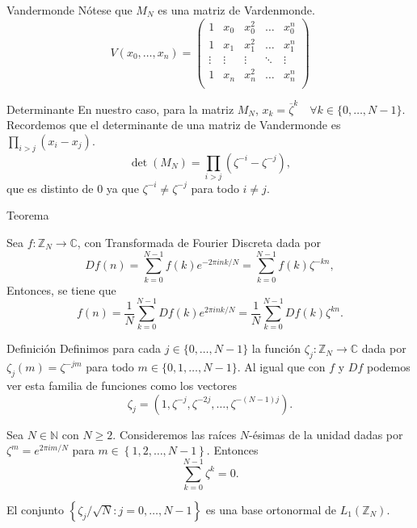 \documentclass[11pt,compress]{beamer}
\newcommand\C{\mathbb{C}}
\newcommand\Z{\mathbb{Z}}
\newcommand\N{\mathbb{N}}
\begin{document}
\begin{frame}
\begin{block}{Vandermonde}
Nótese que $M_N$ es una matriz de Vardenmonde.
\[
V(x_{0},\dots,x_{n})=\begin{pmatrix}
1&x_{0}&x_{0}^{2}&\dots&x_{0}^{n} \\
1&x_{1}&x_{1}^{2}&\dots&x_{1}^{n} \\
\vdots&\vdots&\vdots&\ddots&\vdots\\
1&x_{n}&x_{n}^{2}&\dots&x_{n}^{n} \\
\end{pmatrix}
\]
\end{block}
\begin{block}{Determinante}
En nuestro caso, para la matriz $M_N$, $x_k=\overline{\zeta}^k \quad \forall k \in \{0, \dots, N-1\}$. 
Recordemos que el determinante de una matriz de Vandermonde es $\prod_{i>j}(x_i-x_j)$.
\[
\det(M_N)=\prod_{i>j}(\zeta^{-i}-\zeta^{-j}),
\]
que es distinto de $0$ ya que $\zeta^{-i} \ne \zeta^{-j}$ para todo $i \ne j$.
\end{block}
\end{frame}

\begin{frame}{Teorema}
    \begin{theorem}
    Sea $f:\Z_N \rightarrow \C$, con Transformada de Fourier Discreta dada por
    \[
        Df(n) = \sum_{k=0}^{N-1}f(k)e^{-2\pi ink /N} = \sum_{k=0}^{N-1} f(k)  \zeta ^{-kn},
    \]
    Entonces, se tiene que
    \[
        f(n) = \frac{1}{N} \sum_{k=0}^{N-1} Df(k)e^{2\pi ink / N} = \frac{1}{N} \sum_{k=0}^{N-1} Df(k) \zeta ^{kn}.
    \]
\end{theorem}
\end{frame}

\begin{frame}
\begin{block}{Definición}
Definimos para cada $j \in \{0,\dots,N-1\}$ la función $\zeta_j : \Z_N \to \C$ dada por $\zeta_j(m)= \zeta^{-jm}$ para todo $m \in \{0,1,\ldots,N-1\}$.
Al igual que con $f$ y $Df$ podemos ver esta familia de funciones como los vectores
\[ \zeta_j = \left( 1, \zeta^{-j}, \zeta^{-2j}, \dots , \zeta^{-(N-1)j} \right).\]
\end{block}
\end{frame}

\begin{frame}
\begin{lemma}{}
Sea $N \in \N$ con $N\geq 2$. Consideremos las raíces $N$-ésimas de la unidad dadas por $\zeta^m = e^{2\pi im / N}$ para $m \in \left\{ 1,2, 		\dots , N-1\right\} $. Entonces
\[
\sum_{k=0}^{N-1}\zeta ^k = 0.
\]
\end{lemma}
\begin{lemma}{}
El conjunto $\left\{ \zeta_j / \sqrt{N} : j=0,\dots ,N-1\right\} $ es una base ortonormal de $L_1(\Z_N).$
\end{lemma}
\end{frame}
\end{document}
